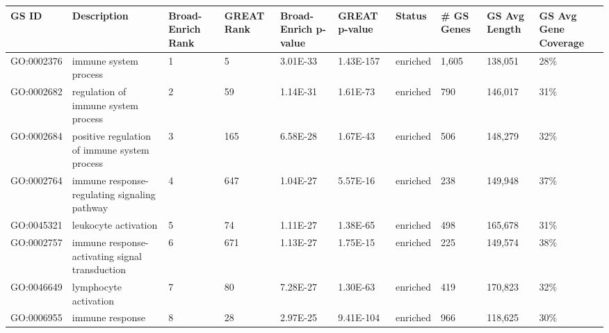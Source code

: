\begin{table}[!ht]
\end{table}

\newpage

\begin{sidewaystable}[!ht]
\tiny
\centering
\begin{tabular}{lp{2cm}p{1cm}p{1cm}p{1.25cm}p{1.25cm}p{1cm}p{1.25cm}p{1.25cm}p{1.25cm}}
\textbf{GS ID}      & \textbf{Description}                                    & \textbf{Broad-Enrich Rank} & \textbf{GREAT Rank} & \textbf{Broad-Enrich p-value} & \textbf{GREAT p-value} & \textbf{Status}   & \textbf{\# GS Genes} & \textbf{GS Avg Length} & \textbf{GS Avg Gene Coverage} \\\hline
GO:0002376 & immune system process                          & 1                 & 5          & 3.01E-33             & 1.43E-157     & enriched & 1,605       & 138,051       & 28\%                 \\
GO:0002682 & regulation of immune system process            & 2                 & 59         & 1.14E-31             & 1.61E-73      & enriched & 790         & 146,017       & 31\%                 \\
GO:0002684 & positive regulation of immune system process   & 3                 & 165        & 6.58E-28             & 1.67E-43      & enriched & 506         & 148,279       & 32\%                 \\
GO:0002764 & immune response-regulating signaling pathway   & 4                 & 647        & 1.04E-27             & 5.57E-16      & enriched & 238         & 149,948       & 37\%                 \\
GO:0045321 & leukocyte activation                           & 5                 & 74         & 1.11E-27             & 1.38E-65      & enriched & 498         & 165,678       & 31\%                 \\
GO:0002757 & immune response-activating signal transduction & 6                 & 671        & 1.13E-27             & 1.75E-15      & enriched & 225         & 149,574       & 38\%                 \\
GO:0046649 & lymphocyte activation                          & 7                 & 80         & 7.28E-27             & 1.30E-63      & enriched & 419         & 170,823       & 32\%                 \\
GO:0006955 & immune response                                & 8                 & 28         & 2.97E-25             & 9.41E-104     & enriched & 966         & 118,625       & 30\%                 \\

\end{tabular}
\end{sidewaystable}
